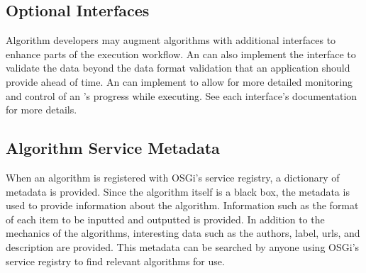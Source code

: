 \subsection{Optional Interfaces}

Algorithm developers may augment algorithms with additional interfaces to enhance
parts of the execution workflow. An  can also implement
the  interface to validate the data beyond the data format
validation that an application should provide ahead of time. An 
can implement  to allow for more detailed monitoring and
control of an 's progress while executing. See each interface's
documentation for more details.

\subsection{Algorithm Service Metadata}
\label{algMetaData}

When an algorithm is registered with OSGi's service registry, a dictionary of
metadata is provided. Since the algorithm itself is a black box, the metadata is
used to provide information about the algorithm. Information such as the format
of each  item to be inputted and outputted is provided. In addition to the
mechanics of the algorithms, interesting data such as the authors, label, urls,
and description are provided. This metadata can be searched by anyone using
OSGi's service registry to find relevant algorithms for use.



